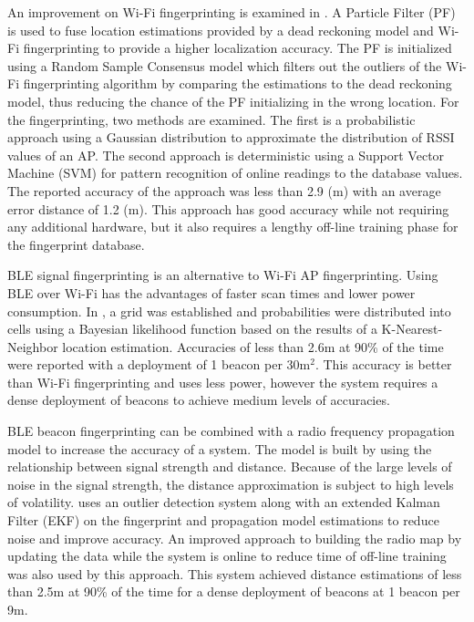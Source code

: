 \documentclass[conference]{IEEEtran}
\begin{document}
An improvement on  Wi-Fi fingerprinting is examined in \cite{wu2016improved}.  A Particle Filter (PF) is used to fuse location estimations provided by a dead reckoning model and Wi-Fi fingerprinting to provide a higher localization accuracy. The PF is initialized using a Random Sample Consensus model which filters out the outliers of the Wi-Fi fingerprinting algorithm by comparing the estimations to the dead reckoning model, thus reducing the chance of the PF initializing in the wrong location. For the fingerprinting, two methods are examined. The first is a probabilistic approach using a Gaussian distribution to approximate the distribution of RSSI values of an AP. The second approach is deterministic using a Support Vector Machine (SVM) for pattern recognition of online readings to the database values.  The reported accuracy of the approach was less than 2.9 (m) with an average error distance of 1.2 (m). This approach has good accuracy while not requiring any additional hardware, but it also requires a lengthy off-line training phase for the fingerprint database.

BLE signal fingerprinting is an alternative to Wi-Fi AP fingerprinting. Using BLE over Wi-Fi has the advantages of faster scan times and lower power consumption. In \cite{faragher2015location}, a grid was established and probabilities were distributed into cells using a Bayesian likelihood function based on the results of a K-Nearest-Neighbor location estimation. Accuracies of less than 2.6m at 90\% of the time were reported with a deployment of 1 beacon per 30m$^2$. This accuracy is better than Wi-Fi fingerprinting and uses less power, however the  system  requires a dense deployment of beacons to achieve medium levels of accuracies.

BLE beacon fingerprinting can be combined with a radio frequency propagation model to increase the accuracy of a system. The model is built by using the relationship between signal strength and distance. Because of the large levels of noise in the signal strength, the distance approximation is subject to high levels of volatility. \cite{zhuang2016smartphone} uses an outlier detection system along with an extended Kalman Filter (EKF) on the fingerprint and propagation model estimations to reduce noise and improve accuracy. An improved approach to building the radio map by updating the data while the system is online to reduce time of off-line training was also used by this approach. This system achieved distance estimations of less than 2.5m at 90\% of the time for a dense deployment of beacons at 1 beacon per 9m.
\end{document}
